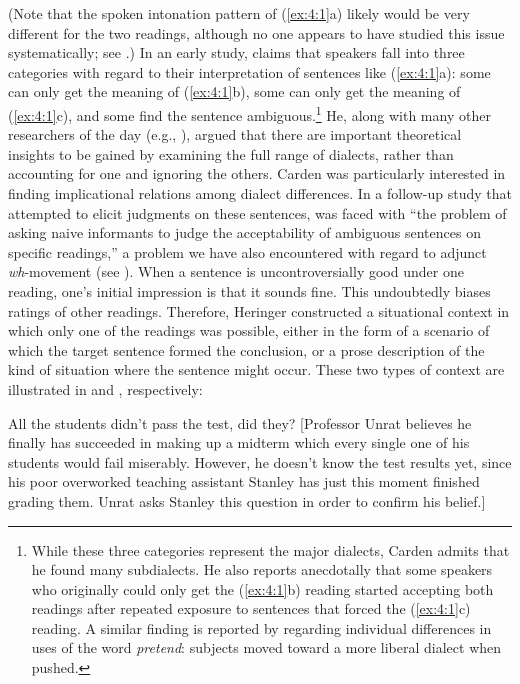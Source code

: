 (Note that the spoken intonation pattern of (\ref{ex:4:1}a) likely would be very different for the two readings, although no one appears to have studied this issue systematically; see .) In an early study, \citet{Carden1970b} claims that speakers fall into three categories with regard to their interpretation of sentences like (\ref{ex:4:1}a): some can only get the meaning of (\ref{ex:4:1}b), some can only get the meaning of (\ref{ex:4:1}c), and some find the sentence ambiguous.\footnote{While these three categories represent the major dialects, Carden admits that he found many subdialects. He also reports anecdotally that some speakers who originally could only get the (\ref{ex:4:1}b) reading started accepting both readings after repeated exposure to sentences that forced the (\ref{ex:4:1}c) reading. A similar finding is reported by \citet{Neubauer1976} regarding individual differences in uses of the word \textit{pretend}: subjects moved toward a more liberal dialect when pushed.}
 He, along with many other researchers of the day (e.g., \citealt{ElliotEtAl1969}), argued that there are important theoretical insights to be gained by examining the full range of dialects, rather than accounting for one and ignoring the others. Carden was particularly interested in finding implicational relations among dialect differences. In a follow-up study that attempted to elicit judgments on these sentences, \citet{Heringer1970} was faced with ``the problem of asking naive informants to judge the acceptability of ambiguous sentences on specific readings,'' a problem we have also encountered with regard to adjunct \textit{wh}-movement (see ). When a sentence is uncontroversially good under one reading, one's initial impression is that it sounds fine. This undoubtedly biases ratings of other readings. Therefore, Heringer constructed a situational context in which only one of the readings was possible, either in the form of a scenario of which the target sentence formed the conclusion, or a prose description of the kind of situation where the sentence might occur. These two types of context are illustrated in  and , respectively:

 \ea \label{ex:4:2}
 All the students didn't pass the test, did they? [Professor Unrat believes he finally has succeeded in making up a midterm which every single one of
his students would fail miserably. However, he doesn't know the test results yet, since his poor overworked teaching assistant Stanley has just this moment finished grading them. Unrat asks Stanley this question in order to confirm his belief.]
\z

